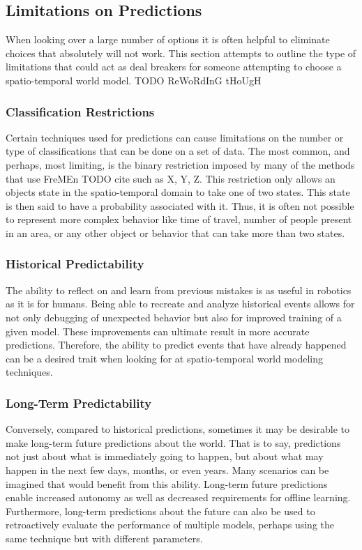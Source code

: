   \subsection { Limitations on Predictions }
  When looking over a large number of options it is often helpful to eliminate
  choices that absolutely will not work. This section attempts to outline
  the type of limitations that could act as deal breakers for someone
  attempting to choose a spatio-temporal world model. TODO ReWoRdInG tHoUgH

  \subsubsection{ Classification Restrictions }
  Certain techniques used for predictions can cause limitations on the number
  or type of classifications that can be done on a set of data. The most common,
  and perhaps, most limiting, is the binary restriction imposed by many of the
  methods that use FreMEn TODO cite such as X, Y, Z. This restriction only
  allows an objects state in the spatio-temporal domain to take one of two
  states. This state is then said to have a probability associated with it.
  Thus, it is often not possible to represent more complex behavior like time
  of travel, number of people present in an area, or any other object or behavior
  that can take more than two states.

  \subsubsection{ Historical Predictability }
  The ability to reflect on and learn from previous mistakes is as useful in
  robotics as it is for humans. Being able to recreate and analyze historical
  events allows for not only debugging of unexpected behavior but also for
  improved training of a given model. These improvements can ultimate result
  in more accurate predictions. Therefore, the ability to predict events that
  have already happened can be a desired trait when looking for at
  spatio-temporal world modeling techniques.

  \subsubsection{ Long-Term Predictability }
  Conversely, compared to historical predictions, sometimes it may be desirable
  to make long-term future predictions about the world. That is to say, predictions
  not just about what is immediately going to happen, but about what may happen
  in the next few days, months, or even years. Many scenarios can be imagined
  that would benefit from this ability. Long-term future predictions enable
  increased autonomy as well as decreased requirements for offline learning.
  Furthermore, long-term predictions about the future can also be used to
  retroactively evaluate the performance of multiple models, perhaps using
  the same technique but with different parameters.


